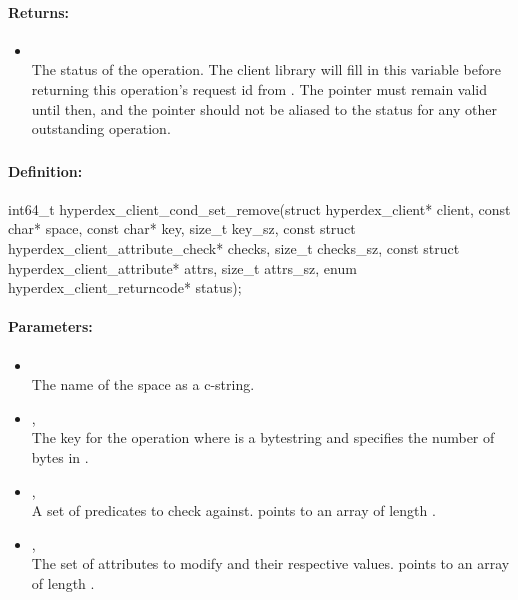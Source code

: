 \paragraph{Returns:}
\begin{itemize}[noitemsep]
\item {}\\
The status of the operation.  The client library will fill in this variable before returning this operation's request id from .  The pointer must remain valid until then, and the pointer should not be aliased to the status for any other outstanding operation.
\end{itemize}

\pagebreak
\subsubsection{}
\label{api:c:cond_set_remove}


\paragraph{Definition:}
\begin{ccode}
int64_t hyperdex_client_cond_set_remove(struct hyperdex_client* client,
        const char* space,
        const char* key, size_t key_sz,
        const struct hyperdex_client_attribute_check* checks, size_t checks_sz,
        const struct hyperdex_client_attribute* attrs, size_t attrs_sz,
        enum hyperdex_client_returncode* status);
\end{ccode}

\paragraph{Parameters:}
\begin{itemize}[noitemsep]
\item {}\\
The name of the space as a c-string.
\item {}, \\
The key for the operation where  is a bytestring and  specifies the number of bytes in .
\item {}, \\
A set of predicates to check against.   points to an array of length .
\item {}, \\
The set of attributes to modify and their respective values.   points to an array of length .
\end{itemize}

